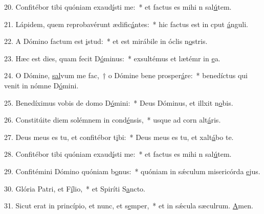 20. Confitébor tibi quóniam exaud\uline{í}sti me:~* et factus es mihi n sal\uline{ú}tem.\par 
21. Lápidem, quem reprobavérunt ædific\uline{á}ntes:~* hic factus est in cput \uline{á}nguli.\par 
22. A Dómino factum est \uline{i}stud:~* et est mirábile in óclis n\uline{o}stris.\par 
23. Hæc est dies, quam fecit D\uline{ó}minus:~* exsultémus et lætémr in \uline{e}a.\par 
24. O Dómine, \uline{sal}vum me fac,~† o Dómine bene prosper\uline{á}re:~* benedíctus qui venit in nómne D\uline{ó}mini.\par 
25. Benedíximus vobis de domo D\uline{ó}mini:~* Deus Dóminus, et illxit n\uline{o}bis.\par 
26. Constitúite diem solémnem in cond\uline{é}nsis,~* usque ad corn alt\uline{á}ris.\par 
27. Deus meus es tu, et confitébor t\uline{i}bi:~* Deus meus es tu, et xalt\uline{á}bo te.\par 
28. Confitébor tibi quóniam exaud\uline{í}sti me:~* et factus es mihi n sal\uline{ú}tem.\par 
29. Confitémini Dómino quóniam b\uline{o}nus:~* quóniam in sǽculum misericórda \uline{e}jus.\par 
30. Glória Patri, et F\uline{í}lio,~* et Spiríti S\uline{a}ncto.\par 
31. Sicut erat in princípio, et nunc, et s\uline{e}mper,~* et in sǽcula sæculrum. \uline{A}men.\par 
